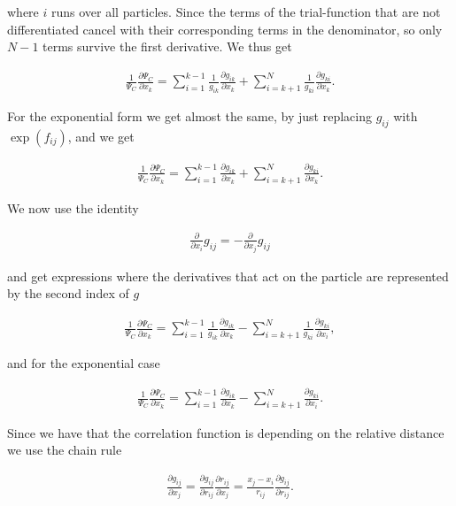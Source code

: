 			where $i$ runs over all particles. Since the terms of the trial-function that are not differentiated
			cancel with their corresponding terms in the denominator, so
			only $N-1$ terms survive the first derivative. We thus get

			\begin{align}
				\frac{1}{\Psi_{C}}\frac{\partial\Psi_{C}}{\partial x_{k}}=\sum_{i=1}^{k-1}\frac{1}{g_{ik}}\frac{\partial g_{ik}}{\partial x_{k}}+\sum_{i=k+1}^{N}\frac{1}{g_{ki}}\frac{\partial g_{ki}}{\partial x_{k}}.
			\end{align}

			For the exponential form we get almost the same, by just replacing
			$g_{ij}$ with $\exp\left(f_{ij}\right)$, and we get

			\begin{align}
				\frac{1}{\Psi_{C}}\frac{\partial\Psi_{C}}{\partial x_{k}}=\sum_{i=1}^{k-1}\frac{\partial g_{ik}}{\partial x_{k}}+\sum_{i=k+1}^{N}\frac{\partial g_{ki}}{\partial x_{k}}.
			\end{align}

			We now use the identity

			\begin{align}
				\frac{\partial}{\partial x_{i}}g_{ij}=-\frac{\partial}{\partial x_{j}}g_{ij}
			\end{align}

			and get expressions where the derivatives that act on the particle
			are represented by the second index of $g$

			\begin{align}
				\frac{1}{\Psi_{C}}\frac{\partial\Psi_{C}}{\partial x_{k}}=\sum_{i=1}^{k-1}\frac{1}{g_{ik}}\frac{\partial g_{ik}}{\partial x_{k}}-\sum_{i=k+1}^{N}\frac{1}{g_{ki}}\frac{\partial g_{ki}}{\partial x_{i}},
			\end{align}

			and for the exponential case

			\begin{align}
				\frac{1}{\Psi_{C}}\frac{\partial\Psi_{C}}{\partial x_{k}}=\sum_{i=1}^{k-1}\frac{\partial g_{ik}}{\partial x_{k}}-\sum_{i=k+1}^{N}\frac{\partial g_{ki}}{\partial x_{i}}.
			\end{align}


			Since we have that the correlation function is depending on the relative
			distance we use the chain rule

			\begin{align}
				\frac{\partial g_{ij}}{\partial x_{j}}=\frac{\partial g_{ij}}{\partial r_{ij}}\frac{\partial r_{ij}}{\partial x_{j}}=\frac{x_{j}-x_{i}}{r_{ij}}\frac{\partial g_{ij}}{\partial r_{ij}}.
			\end{align}

